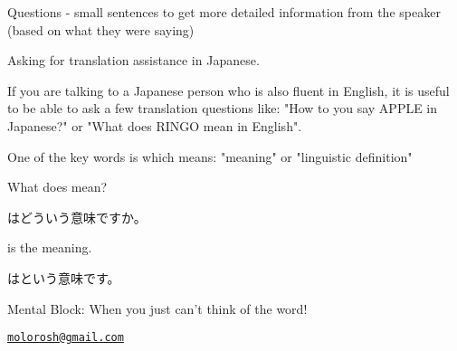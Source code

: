 \documentclass[44pt, oneside]{article}   	%
\begin{document}
Questions - small sentences to get more detailed information from the speaker (based on what they were saying)

Asking for translation assistance in Japanese.

If you are talking to a Japanese person who is also fluent in English, it is useful to be able to ask a few translation questions like: "How to you say APPLE in Japanese?" or "What does RINGO mean in English".

One of the key words is  which means: "meaning" or "linguistic definition"

What does \?{} mean?

\?{}はどういう意味ですか。

\?{} is the meaning.

\?{}はという意味です。



Mental Block: When you just can't think of the word!

\href{mailto:molorosh@gmail.com}{\nolinkurl{molorosh@gmail.com} }
\end{document}
